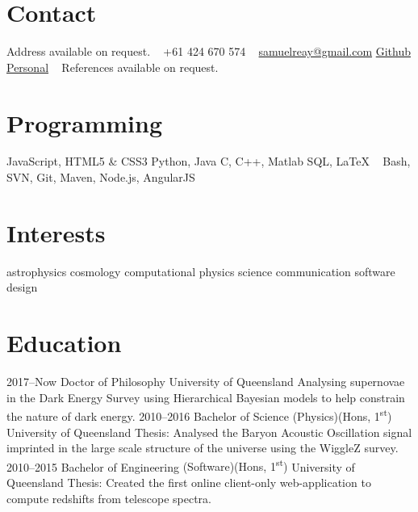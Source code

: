 \documentclass[]{friggeri-cv} %
\begin{document}


\begin{aside} %
\section{Contact}
Address available on request.
~
+61 424 670 574
~
\href{mailto:samuelreay@gmail.com}{samuelreay@gmail.com}
\href{https://github.com/samreay}{Github}
\href{https://Samreay.github.io}{Personal}
~
References available on request.
~
\section{Programming}
JavaScript,
HTML5 \& CSS3
Python, Java
C, C++, Matlab
SQL, LaTeX
~
Bash, SVN, Git, 
Maven, Node.js, AngularJS
~
\section{Interests}
astrophysics
cosmology 
 computational physics 
  science communication 
   software design
\end{aside}



\section{Education}

\begin{entrylist}
\entry
{2017--Now}
{Doctor of Philosophy}
{University of Queensland}
{Analysing supernovae in the Dark Energy Survey using Hierarchical Bayesian models to help constrain the nature of dark energy.}
\entry
{2010--2016}
{Bachelor of Science {\normalfont (Physics)(Hons, 1\textsuperscript{st})}}
{University of Queensland}
{Thesis: Analysed the Baryon Acoustic Oscillation signal imprinted in the large scale structure of the universe using the WiggleZ survey.}
\entry
{2010--2015}
{Bachelor of Engineering {\normalfont (Software)(Hons, 1\textsuperscript{st})}}
{University of Queensland}
{Thesis: Created the first online client-only web-application to compute redshifts from telescope spectra.}

\end{entrylist}
\end{document}
